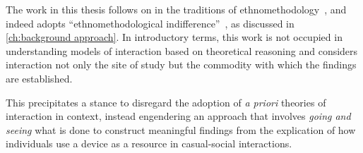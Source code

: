 The work in this thesis follows on in the traditions of ethnomethodology~\citep{Garfinkel1967}, and indeed adopts ``ethnomethodological indifference''~\citep{Garfinkel1970}, as discussed in \autoref{ch:background approach}.
In introductory terms, this work is not occupied in understanding models of interaction based on theoretical reasoning and considers interaction not only the site of study but the commodity with which the findings are established.
\begin{revisedsubmission}
This precipitates a stance to disregard the adoption of \textit{a priori} theories of interaction in context, instead engendering an approach that involves \textit{going and seeing} what is done to construct meaningful findings from the explication of how individuals use a device as a resource in casual-social interactions.
\end{revisedsubmission}


